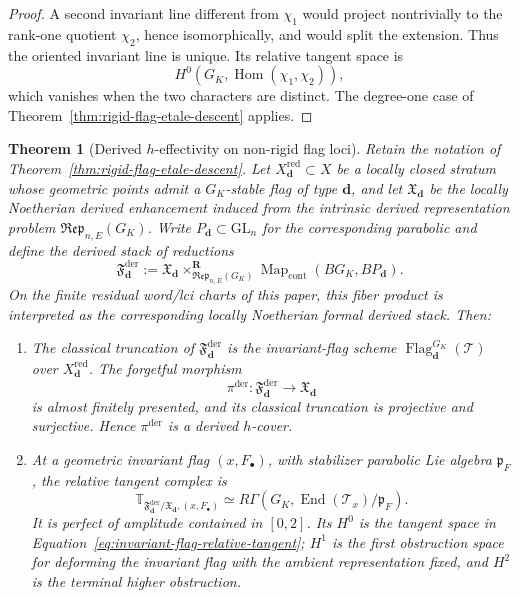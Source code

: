 \documentclass[11pt]{article}
\newtheorem{theorem}{Theorem}[section]
\theoremstyle{definition}
\begin{document}
\begin{proof}
A second invariant line different from $\chi_1$ would project nontrivially to
the rank-one quotient $\chi_2$, hence isomorphically, and would split the
extension.  Thus the oriented invariant line is unique.  Its relative tangent
space is
\[
 H^0\!\left(G_K,\operatorname{Hom}(\chi_1,\chi_2)\right),
\]
which vanishes when the two characters are distinct.  The degree-one case of
Theorem~\ref{thm:rigid-flag-etale-descent} applies.
\end{proof}

\begin{theorem}[Derived $h$-effectivity on non-rigid flag loci]\label{thm:nonrigid-flag-hdescent}
Retain the notation of Theorem~\ref{thm:rigid-flag-etale-descent}.  Let
$X_{\mathbf d}^{\mathrm{red}}\subset X$ be a locally closed stratum whose
geometric points admit a $G_K$-stable flag of type $\mathbf d$, and let
$\mathfrak X_{\mathbf d}$ be the locally Noetherian derived enhancement
induced from the intrinsic derived representation problem
$\mathfrak{Rep}_{n,E}(G_K)$.  Write $P_{\mathbf d}\subset\mathrm{GL}_n$
for the corresponding parabolic and define the derived stack of reductions
\begin{equation}\label{eq:derived-invariant-flag-stack}
 \mathfrak F_{\mathbf d}^{\mathrm{der}}
 :=
 \mathfrak X_{\mathbf d}
 \mathop{\times}^{\mathbf R}_{\mathfrak{Rep}_{n,E}(G_K)}
 \operatorname{Map}_{\mathrm{cont}}(BG_K,BP_{\mathbf d}).
\end{equation}
On the finite residual word/lci charts of this paper, this fiber product is
interpreted as the corresponding locally Noetherian formal derived stack.
Then:

\begin{enumerate}[label=\textnormal{(\roman*)}]
\item The classical truncation of
$\mathfrak F_{\mathbf d}^{\mathrm{der}}$ is the invariant-flag scheme
$\operatorname{Flag}^{G_K}_{\mathbf d}(\mathcal T)$ over
$X_{\mathbf d}^{\mathrm{red}}$.  The forgetful morphism
\[
 \pi^{\mathrm{der}}:
 \mathfrak F_{\mathbf d}^{\mathrm{der}}
 \longrightarrow \mathfrak X_{\mathbf d}
\]
is almost finitely presented, and its classical truncation is projective and
surjective.  Hence $\pi^{\mathrm{der}}$ is a derived $h$-cover.

\item At a geometric invariant flag $(x,F_\bullet)$, with stabilizer
parabolic Lie algebra $\mathfrak p_F$, the relative tangent complex is
\begin{equation}\label{eq:derived-invariant-flag-tangent}
 \mathbb T_{\mathfrak F_{\mathbf d}^{\mathrm{der}}/
                  \mathfrak X_{\mathbf d},(x,F_\bullet)}
 \simeq
 R\Gamma\left(
 G_K,\operatorname{End}(\mathcal T_x)/\mathfrak p_F
 \right).
\end{equation}
It is perfect of amplitude contained in $[0,2]$.  Its $H^0$ is the tangent
space in Equation~\eqref{eq:invariant-flag-relative-tangent}; $H^1$ is the
first obstruction space for deforming the invariant flag with the ambient
representation fixed, and $H^2$ is the terminal higher obstruction.


\end{enumerate}
\end{theorem}
\end{document}
